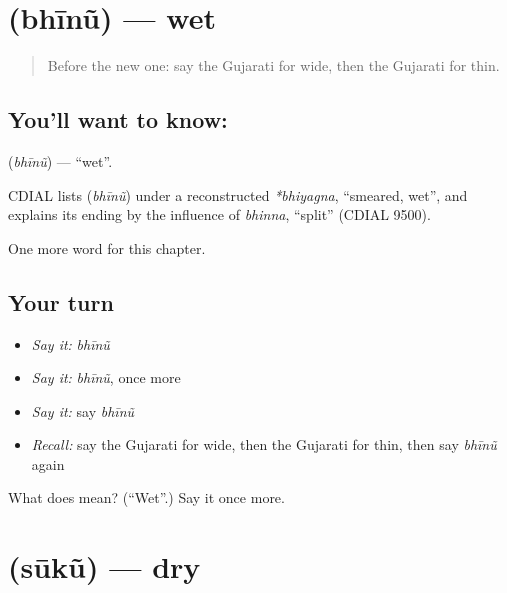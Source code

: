 \section[\texorpdfstring{\gu{ભીનું} (bhīnũ)}{ભીનું (bhīnũ)}]{ (bhīnũ) — wet}

\label{lesson:GU-C131-bhinu}



\begin{quote}
Before the new one: say the Gujarati for wide, then the Gujarati for thin.
\end{quote}

\subsection*{You'll want to know: }
\textbf{} (\emph{bhīnũ}) — \textquotedblleft{}wet\textquotedblright{}.

\begin{cousinweb}
CDIAL lists \textbf{} (\emph{bhīnũ}) under a reconstructed \emph{*bhiyagna}, \textquotedblleft{}smeared, wet\textquotedblright{}, and explains its ending by the influence of \emph{bhinna}, \textquotedblleft{}split\textquotedblright{} (CDIAL 9500).
\end{cousinweb}

\begin{grammarlens}[title={What you've built}]
One more word for this chapter.
\end{grammarlens}

\subsection*{Your turn}
\begin{itemize}
\raggedright
  \item \emph{Say it:} \emph{bhīnũ}
  \item \emph{Say it:} \emph{bhīnũ}, once more
  \item \emph{Say it:} say \emph{bhīnũ}
  \item \emph{Recall:} say the Gujarati for wide, then the Gujarati for thin, then say \emph{bhīnũ} again
\end{itemize}

\begin{tcolorbox}[breakable,colback=teal!4,colframe=teal!35!black,title={Before you move on}]
What does  mean? (\textquotedblleft{}Wet\textquotedblright{}.) Say it once more.
\end{tcolorbox}
\section[\texorpdfstring{\gu{સૂકું} (sūkũ)}{સૂકું (sūkũ)}]{ (sūkũ) — dry}

